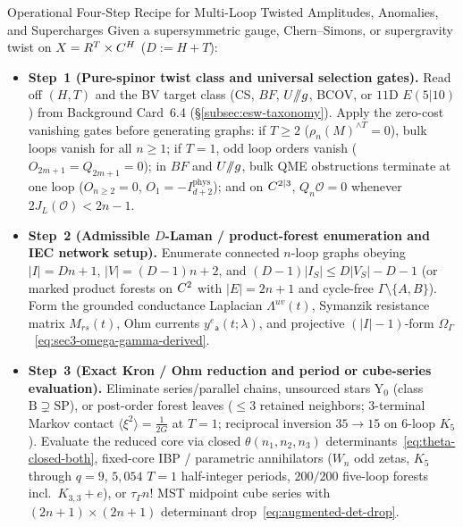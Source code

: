 \begin{summaryblock}{Operational Four-Step Recipe for Multi-Loop Twisted Amplitudes, Anomalies, and Supercharges}
Given a supersymmetric gauge, Chern--Simons, or supergravity twist on $X = R^T\times C^H$ ($D := H+T$):
\begin{itemize}[leftmargin=*]
  \item \textbf{Step~1 (Pure-spinor twist class and universal selection gates).} Read off $(H,T)$ and the BV target class (CS, $BF$, $U/\mkern-6mu/g$, BCOV, or $11\mathrm{D}$ $E(5|10)$) from Background Card~6.4 (\S\ref{subsec:esw-taxonomy}). Apply the zero-cost vanishing gates before generating graphs: if $T \ge 2$ ($\rho_n(M)^{\wedge T} = 0$), bulk loops vanish for all $n \ge 1$; if $T = 1$, odd loop orders vanish ($O_{2m+1} = Q_{2m+1} = 0$); in $BF$ and $U/\mkern-6mu/g$, bulk QME obstructions terminate at one loop ($O_{n\ge 2} = 0$, $O_1 = -I^{\mathrm{phys}}_{d+2}$); and on $C^{2|3}$, $Q_n\mathcal{O} = 0$ whenever $2J_L(\mathcal{O}) < 2n-1$.

  \item \textbf{Step~2 (Admissible $D$-Laman / product-forest enumeration and IEC network setup).} Enumerate connected $n$-loop graphs obeying $|I| = Dn+1$, $|V| = (D-1)n+2$, and $(D-1)|I_S| \le D|V_S|-D-1$ (or marked product forests on $C^2$ with $|E| = 2n+1$ and cycle-free $\Gamma\setminus\{A,B\}$). Form the grounded conductance Laplacian $\Lambda^{uv}(t)$, Symanzik resistance matrix $M_{rs}(t)$, Ohm currents $y^e{}_{\mathsf{a}}(t;\lambda)$, and projective $(|I|-1)$-form $\Omega_\Gamma$~\eqref{eq:sec3-omega-gamma-derived}.

  \item \textbf{Step~3 (Exact Kron / Ohm reduction and period or cube-series evaluation).} Eliminate series/parallel chains, unsourced stars $\mathrm{Y}_0$ (class $\mathrm{B}\supsetneq\mathrm{SP}$), or post-order forest leaves ($\le 3$ retained neighbors; $3$-terminal Markov contact $\langle\xi^2\rangle = \frac{1}{2G}$ at $T=1$; reciprocal inversion $35 \to 15$ on $6$-loop $K_5$). Evaluate the reduced core via closed $\theta(n_1,n_2,n_3)$ determinants~\eqref{eq:theta-closed-both}, fixed-core IBP / parametric annihilators ($W_n$ odd zetas, $K_5$ through $q=9$, $5{,}054$ $T=1$ half-integer periods, $200/200$ five-loop forests incl.\ $K_{3,3}+e$), or $\tau_\Gamma n!$ MST midpoint cube series with $(2n+1)\times(2n+1)$ determinant drop~\eqref{eq:augmented-det-drop}.


\end{itemize}
\end{summaryblock}
